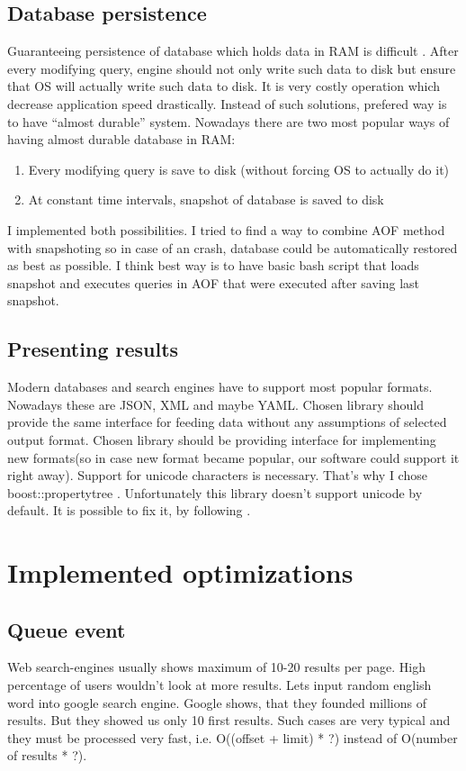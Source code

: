 \documentclass[10pt,a4paper]{article}
\begin{document}
\subsection{Database persistence}
Guaranteeing persistence of database which holds data in RAM is difficult \cite{REDPE} . After every modifying query, engine should not only write such data to disk but ensure that OS will actually write such data to disk. It is very costly operation which decrease application speed drastically. Instead of such solutions, prefered way is to have “almost durable” system.
Nowadays there are two most popular ways of having almost durable database in RAM:

\begin{enumerate}
\item Every modifying query is save to disk (without forcing OS to actually do it)
\item At constant time intervals, snapshot of database is saved to disk
\end{enumerate}
I implemented both possibilities. I tried to find a way to combine AOF method with snapshoting so in case of an crash, database could be automatically restored as best as possible. I think best way is to have basic bash script that loads snapshot and executes queries in AOF that were executed after saving last snapshot.

\subsection{Presenting results}
Modern databases and search engines have to support most popular formats. Nowadays these are
JSON, XML and maybe YAML. Chosen library should provide the same interface for feeding data without any assumptions of selected output format. Chosen library should be providing interface for implementing new formats(so in case new format became popular, our software could support it right away). Support for unicode characters is necessary. That's why I chose boost::property\textunderscore tree . 
Unfortunately this library doesn't support unicode by default. It is possible to fix it, by following  \cite{SOANS} .

\section{Implemented optimizations}
\subsection{Queue event}
Web search-engines usually shows maximum of 10-20 results per page. High percentage of users wouldn't look at more results. Lets input random english word into google search engine. Google shows, that they founded millions of results. But they showed us only 10 first results. Such cases are very typical and they must be processed very fast, i.e. O((offset + limit) * ?) instead of O(number of results * ?).
\end{document}
